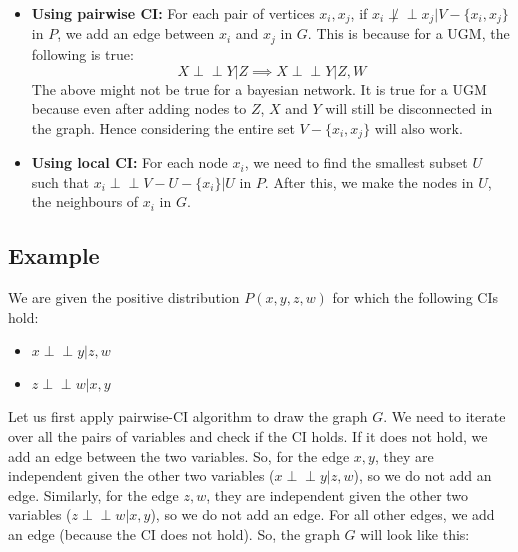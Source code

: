 \documentclass[a4paper]{article}
\begin{document}
\begin{itemize}
    \item {\bf Using pairwise CI:} For each pair of vertices $x_i, x_j $, if $x_i \not\perp\!\!\!\perp x_j | V - \{x_i, x_j\}$ in $P$, we add an edge between $x_i$ and $x_j$ in $G$. This is because for a UGM, the following is true:
    \[X \perp\!\!\!\perp Y | Z \implies X \perp\!\!\!\perp Y | Z, W\]
    The above might not be true for a bayesian network. It is true for a UGM because even after adding nodes to $Z$, $X$ and $Y$ will still be disconnected in the graph. Hence considering the entire set $V - \{x_i, x_j\}$ will also work.
    \item {\bf Using local CI:} For each node $x_i$, we need to find the smallest subset $U$ such that $x_i \perp\!\!\!\perp V - U - \{x_i\} | U$ in $P$. After this, we make the nodes in $U$, the neighbours of $x_i$ in $G$. 
\end{itemize}


\subsection{Example}
We are given the positive distribution $P(x, y, z, w)$ for which the following CIs hold:
\begin{itemize}
    \item $x \perp\!\!\!\perp y | z, w$
    \item $z \perp\!\!\!\perp w | x, y$
\end{itemize}


Let us first apply pairwise-CI algorithm to draw the graph $G$. We need to iterate over all the pairs of variables and check if the CI holds. If it does not hold, we add an edge between the two variables. So, for the edge $x, y$, they are independent given the other two variables ($x \perp\!\!\!\perp y | z, w$), so we do not add an edge. Similarly, for the edge $z, w$, they are independent given the other two variables ($z \perp\!\!\!\perp w | x, y$), so we do not add an edge. For all other edges, we add an edge (because the CI does not hold). So, the graph $G$ will look like this:

\begin{center}
\end{center}
\end{document}
